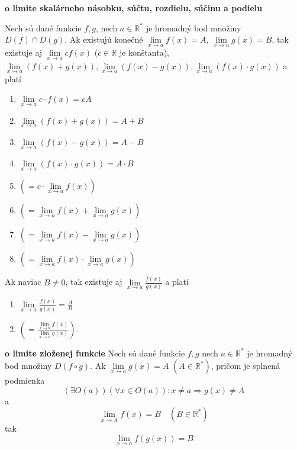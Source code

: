 \begin{veta}
\textbf{o limite skalárneho násobku, súčtu, rozdielu, súčinu a podielu}

Nech sú dané funkcie $f,g$, nech $a \in \mathbb{R^*}$ je hromadný bod množiny
$D(f) \cap D(g)$. Ak existujú konečné $\lim\limits_{x \rightarrow a} f(x)=A$,
$\lim\limits_{x \rightarrow a} g(x)=B$, tak existuje aj
$\lim\limits_{x \rightarrow a} cf(x)$ ($c \in \mathbb{R}$ je konštanta),
$\lim\limits_{x \rightarrow a} (f(x)+g(x)),
\lim\limits_{x \rightarrow a}(f(x)-g(x)),
\lim\limits_{x \rightarrow a} (f(x) \cdot g(x))$
a platí
\begin{multicols}{2}
\begin{enumerate}[label=]
    \item $\lim\limits_{x \rightarrow a} c \cdot f(x) = cA$
    \item $\lim\limits_{x \rightarrow a} (f(x)+g(x)) = A+B$
    \item $\lim\limits_{x \rightarrow a} (f(x)-g(x)) = A-B$
    \item $\lim\limits_{x \rightarrow a} (f(x) \cdot g(x)) = A \cdot B$
    \item $( = c \cdot \lim\limits_{x \rightarrow a} f(x))$
    \item $( = \lim\limits_{x \rightarrow a} f(x)+\lim\limits_{x \rightarrow a} g(x))$
    \item $( = \lim\limits_{x \rightarrow a} f(x)-\lim\limits_{x \rightarrow a} g(x))$
    \item $( = \lim\limits_{x \rightarrow a} f(x) \cdot \lim\limits_{x \rightarrow a} g(x))$
\end{enumerate}
\end{multicols}
Ak naviac $B \neq 0$, tak existuje aj $\lim\limits_{x \rightarrow a} \frac{f(x)}{g(x)}$
a platí
\begin{multicols}{2}
\begin{enumerate}[label=]
\item $\lim\limits_{x \rightarrow a} \frac{f(x)}{g(x)}=\frac{A}{B}$
\item $(=\frac{\lim\limits_{x \rightarrow a} f(x)}{\lim\limits_{x \rightarrow a} g(x)})$.
\end{enumerate}
\end{multicols}
\end{veta}

\begin{veta} \textbf{o limite zloženej funkcie}
Nech sú dané funkcie $f, g$ nech $a \in \mathbb{R^*}$ je hromadný bod množiny
$D(f \circ g)$. Ak $\lim\limits_{x \rightarrow a} g(x) = A$ $(A \in
\mathbb{R^*})$, pričom je splnená podmienka
\[
  (\exists O(a))
    (\forall x \in O(a)):
      x \neq a \Rightarrow g(x) \neq A
\]
a
\[
  \lim\limits_{x \rightarrow A} f(x) = B \quad (B \in \mathbb{R^*})
\]
tak
\[
  \lim\limits_{x \rightarrow a} f(g(x)) = B
\]
\end{veta}

